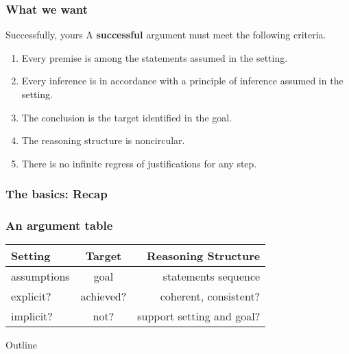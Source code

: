 \documentclass{beamer}
\begin{document}
\subsubsection{What we want}
\begin{frame}{Successfully, yours}
A \textbf{successful} argument must meet the following criteria. \pause
\begin{enumerate}[<+-| alert@+>]
\item Every premise is among the statements assumed in the setting.
\item Every inference is in accordance with a principle of inference assumed in the setting.
\item The conclusion is the target identified in the goal.
\item The reasoning structure is noncircular.
\item There is no infinite regress of justifications for any step.
\end{enumerate}
\end{frame}

\subsubsection{The basics: Recap} 
\begin{frame}\frametitle{An argument table}
\begin{center}
\begin{tabular}{|l|c|r|}
\hline
\textbf{Setting} & \textbf{Target} & \textbf{Reasoning Structure}\\
\hline 
assumptions & goal & statements sequence\\
\hline 
explicit? & achieved? & coherent, consistent?\\
\hline
implicit? & not? & support setting and goal? \\
\hline
\end{tabular}
\end{center}
\end{frame}


\begin{frame}
  \titlepage
\end{frame}

\begin{frame}{Outline}
  \tableofcontents
\end{frame}



\end{document}
